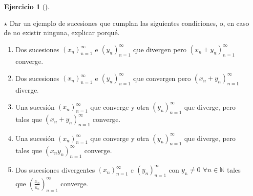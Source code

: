 \documentclass[
  spanish,
  a4paper,
]{scrreport}
\providecommand{\tightlist}{%
  \setlength{\itemsep}{0pt}\setlength{\parskip}{0pt}}
\theoremstyle{definition}
\newtheorem{exercise}{Ejercicio}[chapter]
\theoremstyle{remark}
\begin{document}
\begin{exercise}[]\protect\hypertarget{exr-ejemplo-sucesiones-2}{}\label{exr-ejemplo-sucesiones-2}

\(\star\) Dar un ejemplo de sucesiones que cumplan las siguientes
condiciones, o, en caso de no existir ninguna, explicar porqué.

\begin{enumerate}
\def\labelenumi{\alph{enumi}.}
\tightlist
\item
  Dos sucesiones \((x_n)_{n=1}^\infty\) e \((y_n)_{n=1}^\infty\) que
  divergen pero \((x_n+y_n)_{n=1}^\infty\) converge.
\item
  Dos sucesiones \((x_n)_{n=1}^\infty\) e \((y_n)_{n=1}^\infty\) que
  convergen pero \((x_n+y_n)_{n=1}^\infty\) diverge.
\item
  Una sucesión \((x_n)_{n=1}^\infty\) que converge y otra
  \((y_n)_{n=1}^\infty\) que diverge, pero tales que
  \((x_n+y_n)_{n=1}^\infty\) converge.
\item
  Una sucesión \((x_n)_{n=1}^\infty\) que converge y otra
  \((y_n)_{n=1}^\infty\) que diverge, pero tales que
  \((x_ny_n)_{n=1}^\infty\) converge.
\item
  Dos sucesiones divergentes \((x_n)_{n=1}^\infty\) e
  \((y_n)_{n=1}^\infty\) con \(y_n\neq 0\) \(\forall n\in\mathbb{N}\)
  tales que \(\left(\frac{x_n}{y_n}\right)_{n=1}^\infty\) converge.
\end{enumerate}

\end{exercise}
\end{document}
